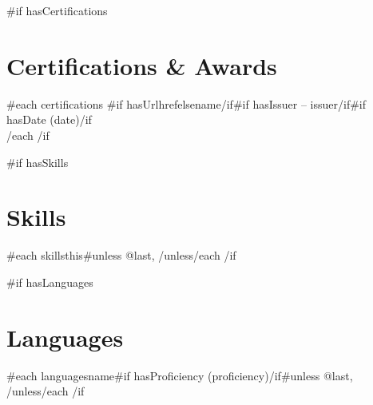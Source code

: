 \documentclass[11pt,a4paper]{article}
\begin{document}
{{#if hasCertifications}}
\section*{Certifications \& Awards}
{{#each certifications}}
{{#if hasUrl}}{{href}}{{else}}{{name}}{{/if}}{{#if hasIssuer}} -- {{issuer}}{{/if}}{{#if hasDate}} ({{date}}){{/if}}\\
{{/each}}
{{/if}}

{{#if hasSkills}}
\section*{Skills}
{{#each skills}}{{this}}{{#unless @last}}, {{/unless}}{{/each}}
{{/if}}

{{#if hasLanguages}}
\section*{Languages}
{{#each languages}}{{name}}{{#if hasProficiency}} ({{proficiency}}){{/if}}{{#unless @last}}, {{/unless}}{{/each}}
{{/if}}
\end{document}
